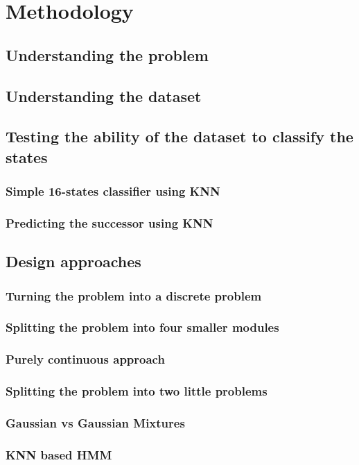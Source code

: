 \chapter{Methodology}

\section{Understanding the problem}
\section{Understanding the dataset}

\section{Testing the ability of the dataset to classify the states}

\subsection{Simple 16-states classifier using KNN}
\subsection{Predicting the successor using KNN}

\section{Design approaches}

\subsection{Turning the problem into a discrete problem}
\subsection{Splitting the problem into four smaller modules}

\subsection{Purely continuous approach}
\subsection{Splitting the problem into two little problems}
\subsection{Gaussian vs Gaussian Mixtures}
\subsection{KNN based HMM}